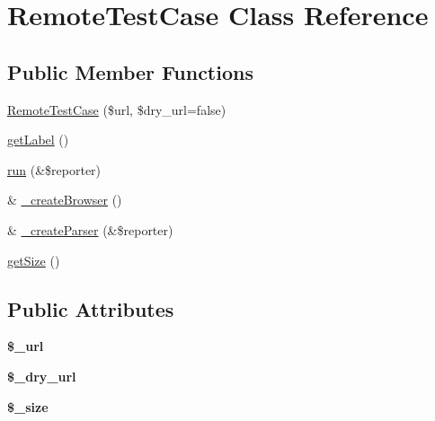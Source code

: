 \hypertarget{class_remote_test_case}{
\section{RemoteTestCase Class Reference}
\label{class_remote_test_case}
}
\subsection*{Public Member Functions}
\begin{DoxyCompactItemize}
\item 
\hyperlink{class_remote_test_case_af83e6243125f949fadac82abe7714769}{RemoteTestCase} (\$url, \$dry\_\-url=false)
\item 
\hyperlink{class_remote_test_case_a0003c0c46b06c2ff40f51c327db5d55b}{getLabel} ()
\item 
\hyperlink{class_remote_test_case_ad6d2c5e3b7a342afc77f3a103cc25582}{run} (\&\$reporter)
\item 
\& \hyperlink{class_remote_test_case_a29a8f3f05c7546983e7b328b39b3eeb2}{\_\-createBrowser} ()
\item 
\& \hyperlink{class_remote_test_case_ad85338bf69bf50ccaa23b127f44c6cfb}{\_\-createParser} (\&\$reporter)
\item 
\hyperlink{class_remote_test_case_a22dd4b81206d8e163a23f14b828c5826}{getSize} ()
\end{DoxyCompactItemize}
\subsection*{Public Attributes}
\begin{DoxyCompactItemize}
\item 
\hypertarget{class_remote_test_case_aec3ef501c7b5128e9cb4e6398941513a}{
{\bfseries \$\_\-url}}
\label{class_remote_test_case_aec3ef501c7b5128e9cb4e6398941513a}

\item 
\hypertarget{class_remote_test_case_a1c05d965f8626b878749d028b6ddc1d2}{
{\bfseries \$\_\-dry\_\-url}}
\label{class_remote_test_case_a1c05d965f8626b878749d028b6ddc1d2}

\item 
\hypertarget{class_remote_test_case_a703568d5c833bac69c6c1d2f5c6ef176}{
{\bfseries \$\_\-size}}
\label{class_remote_test_case_a703568d5c833bac69c6c1d2f5c6ef176}

\end{DoxyCompactItemize}


